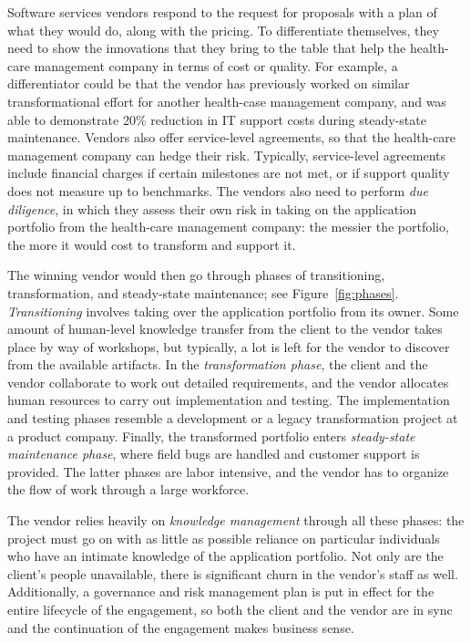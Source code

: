 Software services vendors respond to the request for proposals with a plan of
what they would do, along with the pricing. To differentiate themselves, they
need to show the innovations that they bring to the table that help the
health-care management company in terms of cost or quality. For example, a
differentiator could be that the vendor has previously worked on similar
transformational effort for another health-case management company, and was able
to demonstrate 20\% reduction in IT support costs during steady-state
maintenance. Vendors also offer service-level agreements, so that the
health-care management company can hedge their risk.  Typically, service-level
agreements include financial charges if certain milestones are not met, or if
support quality does not measure up to benchmarks. The vendors also need to
perform \textit{due diligence}, in which they assess their own risk in taking on
the application portfolio from the health-care management company: the messier
the portfolio, the more it would cost to transform and support it.

The winning vendor would then go through phases of transitioning,
transformation, and steady-state maintenance; see
Figure~\ref{fig:phases}. \textit{Transitioning} involves taking over the
application portfolio from its owner. Some amount of human-level knowledge
transfer from the client to the vendor takes place by way of workshops, but
typically, a lot is left for the vendor to discover from the available
artifacts. In the \textit{transformation phase}, the client and the vendor
collaborate to work out detailed requirements, and the vendor allocates human
resources to carry out implementation and testing. The implementation and
testing phases resemble a development or a legacy transformation project at a
product company.  Finally, the transformed portfolio enters \textit{steady-state
  maintenance phase}, where field bugs are handled and customer support is
provided.  The latter phases are labor intensive, and the vendor has to organize
the flow of work through a large workforce.

The vendor relies heavily on \textit{knowledge management} through all these
phases: the project must go on with as little as possible reliance on particular
individuals who have an intimate knowledge of the application portfolio. Not
only are the client's people unavailable, there is significant churn in the
vendor's staff as well.  Additionally, a governance and risk management plan is
put in effect for the entire lifecycle of the engagement, so both the client and
the vendor are in sync and the continuation of the engagement makes business
sense.

